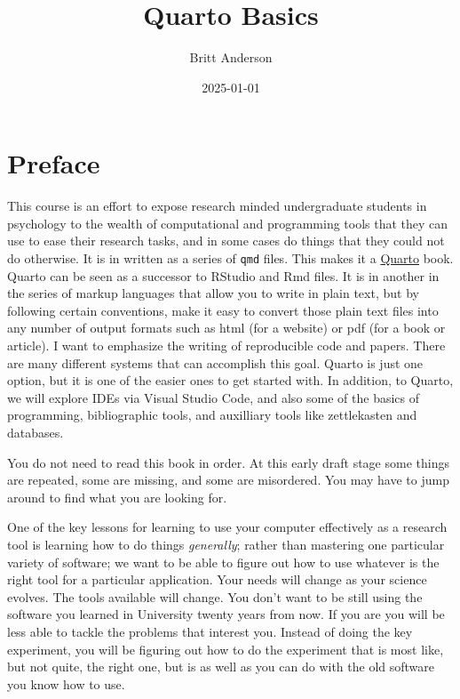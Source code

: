 \documentclass[
  letterpaper,
  DIV=11,
  numbers=noendperiod]{scrreprt}
\title{Quarto Basics}
\author{Britt Anderson}
\date{2025-01-01}
\renewcommand*\contentsname{Table of contents}
\newcommand\contentsname{Table of contents}
\begin{document}
\maketitle

\renewcommand*\contentsname{Table of contents}
{
\hypersetup{linkcolor=}
\setcounter{tocdepth}{2}
\tableofcontents
}


\chapter*{Preface}\label{preface}


This course is an effort to expose research minded undergraduate
students in psychology to the wealth of computational and programming
tools that they can use to ease their research tasks, and in some cases
do things that they could not do otherwise. It is in written as a series
of \texttt{qmd} files. This makes it a
\href{https://quarto.org/}{Quarto} book. Quarto can be seen as a
successor to RStudio and Rmd files. It is in another in the series of
markup languages that allow you to write in plain text, but by following
certain conventions, make it easy to convert those plain text files into
any number of output formats such as html (for a website) or pdf (for a
book or article). I want to emphasize the writing of reproducible code
and papers. There are many different systems that can accomplish this
goal. Quarto is just one option, but it is one of the easier ones to get
started with. In addition, to Quarto, we will explore IDEs via Visual
Studio Code, and also some of the basics of programming, bibliographic
tools, and auxilliary tools like zettlekasten and databases.

You do not need to read this book in order. At this early draft stage
some things are repeated, some are missing, and some are misordered. You
may have to jump around to find what you are looking for.

One of the key lessons for learning to use your computer effectively as
a research tool is learning how to do things \emph{generally}; rather
than mastering one particular variety of software; we want to be able to
figure out how to use whatever is the right tool for a particular
application. Your needs will change as your science evolves. The tools
available will change. You don't want to be still using the software you
learned in University twenty years from now. If you are you will be less
able to tackle the problems that interest you. Instead of doing the key
experiment, you will be figuring out how to do the experiment that is
most like, but not quite, the right one, but is as well as you can do
with the old software you know how to use.
\end{document}
